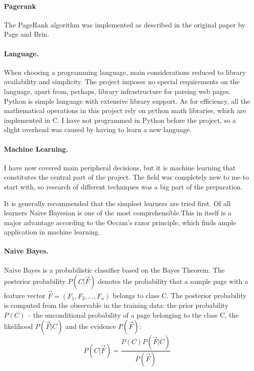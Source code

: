 \documentclass[12pt,twoside,notitlepage]{report}
\begin{document}
\paragraph{Pagerank} 
The PageRank algorithm was implemented as described in the original paper
by Page and Brin\cite{pagerank}.
\paragraph{Language.}

When choosing a programming language, main considerations reduced to library
availability and simplicity. The project imposes no special  requirements on the
language, apart from, perhaps, library infrastructure for parsing web pages.
Python is simple language with extensive library support. As
for efficiency, all the mathematical operations in this project rely on python
math libraries, which are implemented in C. I have not programmed in Python
before the project, so a slight overhead was caused by having to learn a new
language.

\paragraph{Machine Learning.}

I have now covered main peripheral decisions, but it is machine learning that
constitutes the central part of the project. The field was completely new to me
to start with, so research of different techniques was a big part of the
preparation.

It is generally recommended that the simplest learners are tried
first\cite{domingos}. Of all learners Naive Bayesian is one of the most
comprehensible.This in itself is a major advantage according to the Occam's
razor principle, which finds ample application in machine learning.

\paragraph{Naive Bayes.}Naive Bayes is a probabilistic classifier based on the Bayes Theorem. The
posterior probability \(P(C|\vec{F})\) denotes the probability that a sample
page with a feature vector \(\vec{F}=(F_1,F_2,\dots,F_n)\) belongs to class C.
The posterior probability is computed from the observable in the training data: the prior
probability \(P(C)\) -- the unconditional probability of a page belonging to
the class C, the likelihood \(P(\vec{F}|C)\) and the evidence \(P(\vec{F})\):
\begin{equation}
P(C|\vec{F}) = \frac{P(C)P(\vec{F}|C)}{P(\vec{F})}
\end{equation}
\end{document}

